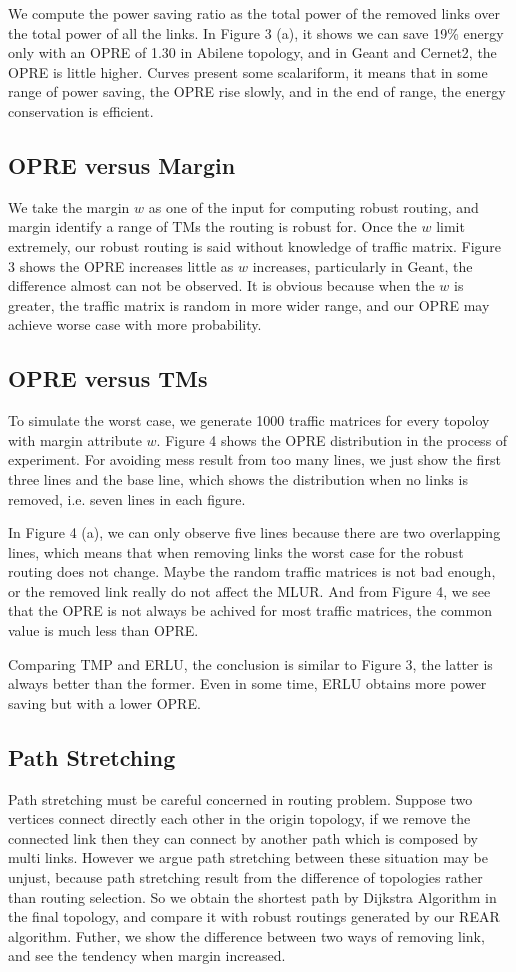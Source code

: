 \documentclass[conference]{IEEEtran}
\begin{document}
We compute the power saving ratio as the total power of the removed links over the total power of all the links. 
In Figure 3 (a), it shows we can save 19\% energy only with an OPRE of 1.30 in Abilene topology, and in Geant and Cernet2, 
the OPRE is little higher. Curves present some scalariform, it means that in some range of power saving, the OPRE rise slowly,
and in the end of range, the energy conservation is efficient.


\subsection{OPRE versus Margin}
We take the margin $w$ as one of the input for computing robust routing, and margin identify a range of TMs the routing is 
robust for. Once the $w$ limit extremely, our robust routing is said without knowledge of traffic matrix. Figure 3 shows the 
OPRE increases little as $w$ increases, particularly in Geant, the difference almost can not be observed. It is obvious because
when the $w$ is greater, the traffic matrix is random in more wider range, and our OPRE may achieve worse case with more probability.


\subsection{OPRE versus TMs}
To simulate the worst case, we generate 1000 traffic matrices for every topoloy with margin attribute $w$. Figure 4 shows
the OPRE distribution in the process of experiment. For avoiding mess result from too many lines, we just show the first 
three lines and the base line, which shows the distribution when no links is removed, i.e. seven lines in each figure.


In Figure 4 (a), we can only observe five lines because there are two overlapping lines, which means that when removing 
links the worst case for the robust routing does not change. Maybe the random traffic matrices is not bad enough, or the 
removed link really do not affect the MLUR. And from Figure 4, we see that the OPRE is not always be achived for most
traffic matrices, the common value is much less than OPRE. 


Comparing TMP and ERLU, the conclusion is similar to Figure 3, the latter is always better than the former. Even in some 
time, ERLU obtains more power saving but with a lower OPRE.

\subsection{Path Stretching}
Path stretching must be careful concerned in routing problem. Suppose two vertices connect directly each other in the origin topology,
if we remove the connected link then they can connect by another path which is composed by multi links. However we argue path stretching
between these situation may be unjust, because path stretching result from the difference of topologies rather than routing selection.
So we obtain the shortest path by Dijkstra Algorithm in the final topology, and compare it with robust routings generated by 
our REAR algorithm. Futher, we show the difference between two ways of removing link, and see the tendency when margin increased.
\end{document}

